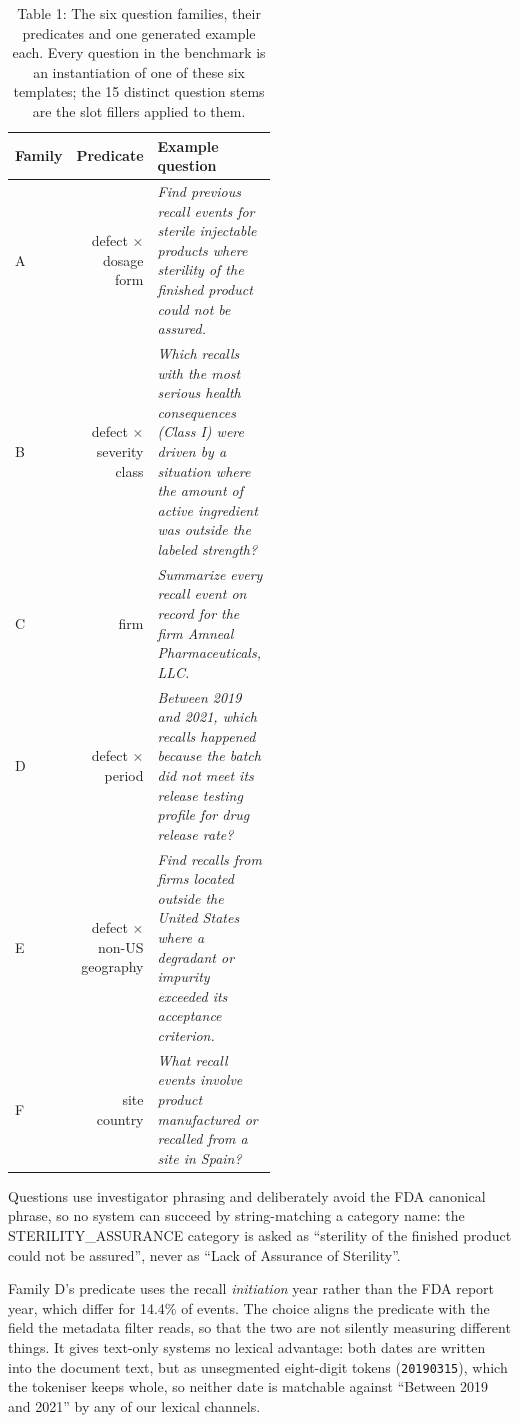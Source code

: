 \documentclass[runningheads]{llncs}
\begin{document}
\begin{table}[t]
\centering
\small
\caption{Table 1: The six question families, their predicates and one generated example each. Every question in the benchmark is an instantiation of one of these six templates; the 15 distinct question stems are the slot fillers applied to them.}
\begin{tabular}{lrp{0.52\linewidth}}
\toprule
Family & Predicate & Example question \\
\midrule
A & defect $\times$ dosage form & \textit{Find previous recall events for sterile injectable products where sterility of the finished product could not be assured.} \\
B & defect $\times$ severity class & \textit{Which recalls with the most serious health consequences (Class I) were driven by a situation where the amount of active ingredient was outside the labeled strength?} \\
C & firm & \textit{Summarize every recall event on record for the firm Amneal Pharmaceuticals, LLC.} \\
D & defect $\times$ period & \textit{Between 2019 and 2021, which recalls happened because the batch did not meet its release testing profile for drug release rate?} \\
E & defect $\times$ non-US geography & \textit{Find recalls from firms located outside the United States where a degradant or impurity exceeded its acceptance criterion.} \\
F & site country & \textit{What recall events involve product manufactured or recalled from a site in Spain?} \\
\bottomrule
\end{tabular}
\end{table}

Questions use investigator phrasing and deliberately avoid the FDA canonical phrase, so no system can succeed by string-matching a category name: the STERILITY\_ASSURANCE category is asked as ``sterility of the finished product could not be assured'', never as ``Lack of Assurance of Sterility''.

Family D's predicate uses the recall \textit{initiation} year rather than the FDA report year, which differ for 14.4\% of events. The choice aligns the predicate with the field the metadata filter reads, so that the two are not silently measuring different things. It gives text-only systems no lexical advantage: both dates are written into the document text, but as unsegmented eight-digit tokens (\texttt{20190315}), which the tokeniser keeps whole, so neither date is matchable against ``Between 2019 and 2021'' by any of our lexical channels.
\end{document}
